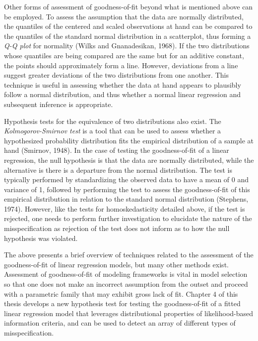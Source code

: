 		Other forms of assessment of goodness-of-fit beyond what is mentioned above can be employed. To assess the assumption that the data are normally distributed, the quantiles of the centered
		and scaled observations at hand can be compared to the quantiles of the standard normal distribution in a scatterplot, thus forming a \textit{Q-Q plot} for normality (Wilks and Gnanadesikan, 1968).
		If the two distributions whose quantiles are being compared are the same but for an additive constant, the points should approximately form a line. However, deviations from a line suggest
		greater deviations of the two distributions from one another. This technique is useful in assessing whether the data at hand appears to plausibly follow a normal distribution, and thus
		whether a normal linear regression and subsequent inference is appropriate.
		
		Hypothesis tests for the equivalence of two distributions also exist. The \textit{Kolmogorov-Smirnov test} is a tool that can be used to assess whether a hypothesized probability distribution
		fits the empirical distribution of a sample at hand (Smirnov, 1948). In the case of testing the goodness-of-fit of a linear regression, the null hypothesis is that the data are normally
		distributed, while the alternative is there is a departure from the normal distribution. The test is typically performed by standardizing the observed data to have a mean of 0 and variance of 1,
		followed by performing the test to assess the goodness-of-fit of this empirical distribution in relation to the standard normal distribution (Stephens, 1974). However, like the tests for
		homoskedasticity detailed above, if the test is rejected, one needs to perform further investigation to elucidate the nature of the misspecification as rejection of the test does not inform
		as to how the null hypothesis was violated.

		The above presents a brief overview of techniques related to the assessment of the goodness-of-fit of linear regression models, but many other methods exist. Assessment of goodness-of-fit
		of modeling frameworks is vital in model selection so that one does not make an incorrect assumption from the outset and proceed with a parametric family that may exhibit gross lack of 
		fit. Chapter 4 of this thesis develops a new hypothesis test for testing the goodness-of-fit of a fitted linear regression model that leverages distributional properties of likelihood-based
		information criteria, and can be used to detect an array of different types of misspecification.

